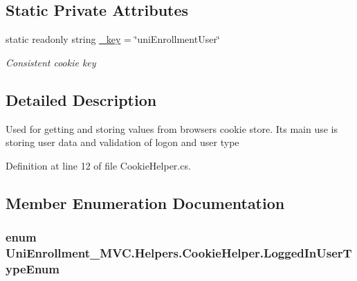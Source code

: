 \subsection*{Static Private Attributes}
\begin{DoxyCompactItemize}
\item 
static readonly string \hyperlink{class_uni_enrollment___m_v_c_1_1_helpers_1_1_cookie_helper_a94ac4283c0121050ef36d4080b526292}{\+\_\+key} = \char`\"{}uni\+Enrollment\+User\char`\"{}
\begin{DoxyCompactList}\small\item\em Consistent cookie key \end{DoxyCompactList}\end{DoxyCompactItemize}


\subsection{Detailed Description}
Used for getting and storing values from browser\textquotesingle{}s cookie store. It\textquotesingle{}s main use is storing user data and validation of logon and user type 



Definition at line 12 of file Cookie\+Helper.\+cs.



\subsection{Member Enumeration Documentation}
\subsubsection[{\texorpdfstring{Logged\+In\+User\+Type\+Enum}{LoggedInUserTypeEnum}}]{\setlength{\rightskip}{0pt plus 5cm}enum {\bf Uni\+Enrollment\+\_\+\+M\+V\+C.\+Helpers.\+Cookie\+Helper.\+Logged\+In\+User\+Type\+Enum}\hspace{0.3cm}{\ttfamily [strong]}}\hypertarget{class_uni_enrollment___m_v_c_1_1_helpers_1_1_cookie_helper_a6ccf3689f1679dfef56e5e7e3a5f17c9}{}\label{class_uni_enrollment___m_v_c_1_1_helpers_1_1_cookie_helper_a6ccf3689f1679dfef56e5e7e3a5f17c9}


